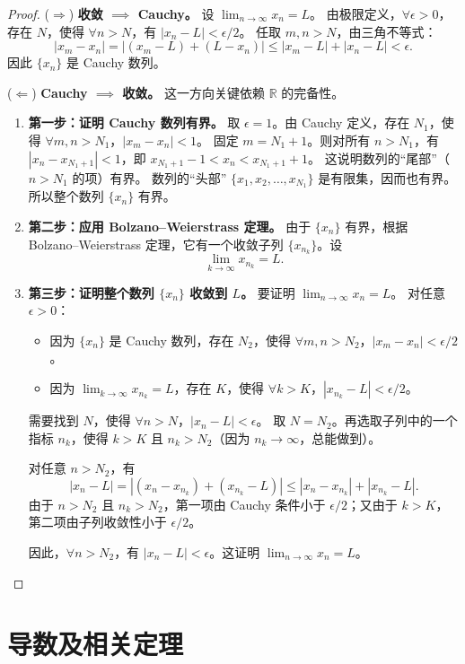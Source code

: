 \begin{proof}
($\Rightarrow$) \textbf{收敛 $\implies$ Cauchy。}
设 $\lim_{n\to \infty}x_n=L$。
由极限定义，$\forall \epsilon>0$，存在 $N$，使得 $\forall n>N$，有 $|x_n-L|<\epsilon/2$。
任取 $m,n>N$，由三角不等式：
\[
|x_m-x_n|=|(x_m-L)+(L-x_n)|\le |x_m-L|+|x_n-L|<\epsilon.
\]
因此 $\{x_n\}$ 是 Cauchy 数列。

($\Leftarrow$) \textbf{Cauchy $\implies$ 收敛。}
这一方向关键依赖 $\mathbb{R}$ 的完备性。
\begin{enumerate}
    \item \textbf{第一步：证明 Cauchy 数列有界。}
    取 $\epsilon=1$。由 Cauchy 定义，存在 $N_1$，使得 $\forall m,n>N_1$，$|x_m-x_n|<1$。
    固定 $m=N_1+1$。则对所有 $n>N_1$，有 $|x_n-x_{N_1+1}|<1$，即 $x_{N_1+1}-1<x_n<x_{N_1+1}+1$。
    这说明数列的“尾部”（$n>N_1$ 的项）有界。
    数列的“头部” $\{x_1,x_2,\dots,x_{N_1}\}$ 是有限集，因而也有界。
    所以整个数列 $\{x_n\}$ 有界。
    \item \textbf{第二步：应用 Bolzano--Weierstrass 定理。}
    由于 $\{x_n\}$ 有界，根据 Bolzano--Weierstrass 定理，它有一个收敛子列 $\{x_{n_k}\}$。设
    \[
    \lim_{k\to \infty}x_{n_k}=L.
    \]
    \item \textbf{第三步：证明整个数列 $\{x_n\}$ 收敛到 $L$。}
    要证明 $\lim_{n\to \infty}x_n=L$。
    对任意 $\epsilon>0$：
    \begin{itemize}
        \item 因为 $\{x_n\}$ 是 Cauchy 数列，存在 $N_2$，使得 $\forall m,n>N_2$，$|x_m-x_n|<\epsilon/2$。
        \item 因为 $\lim_{k\to \infty}x_{n_k}=L$，存在 $K$，使得 $\forall k>K$，$|x_{n_k}-L|<\epsilon/2$。
    \end{itemize}
    需要找到 $N$，使得 $\forall n>N$，$|x_n-L|<\epsilon$。
    取 $N=N_2$。再选取子列中的一个指标 $n_k$，使得 $k>K$ 且 $n_k>N_2$（因为 $n_k\to \infty$，总能做到）。

    对任意 $n>N_2$，有
    \[
    |x_n-L|=|(x_n-x_{n_k})+(x_{n_k}-L)|\le |x_n-x_{n_k}|+|x_{n_k}-L|.
    \]
    由于 $n>N_2$ 且 $n_k>N_2$，第一项由 Cauchy 条件小于 $\epsilon/2$；又由于 $k>K$，第二项由子列收敛性小于 $\epsilon/2$。

    因此，$\forall n>N_2$，有 $|x_n-L|<\epsilon$。这证明 $\lim_{n\to \infty}x_n=L$。
\end{enumerate}
\end{proof}

\section{导数及相关定理}

